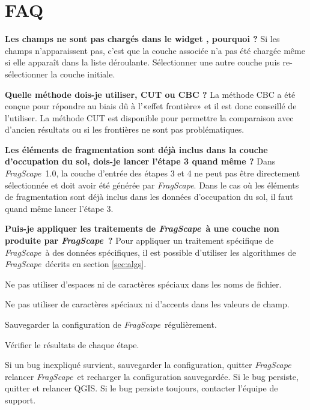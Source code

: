 \documentclass[11pt]{article}
\newcommand{\tool}{\emph{FragScape}}
\let\tempone\itemize
\let\temptwo\enditemize
\renewenvironment{itemize}{\tempone\addtolength{\itemsep}{-0.5\baselineskip}}{\temptwo}
\begin{document}
\section{FAQ}

\begin{itemize}
\item \textbf{Les champs ne sont pas chargés dans le widget , pourquoi ?} Si les champs n'apparaissent pas, c'est que la couche associée n'a pas été chargée même si elle apparaît dans la liste déroulante. Sélectionner une autre couche puis re-sélectionner la couche initiale.

\item \textbf{Quelle méthode dois-je utiliser, CUT ou CBC ?} La méthode CBC a été conçue pour répondre au biais dû à l'«effet frontière» et il est donc conseillé de l'utiliser. La méthode CUT est disponible pour permettre la comparaison avec d'ancien résultats ou si les frontières ne sont pas problématiques.

\item \textbf{Les éléments de fragmentation sont déjà inclus dans la couche d'occupation du sol, dois-je lancer l'étape 3 quand même ?} Dans \tool\ 1.0, la couche d'entrée des étapes 3 et 4 ne peut pas être directement sélectionnée et doit avoir été générée par \tool. Dans le cas où les éléments de fragmentation sont déjà inclus dans les données d'occupation du sol, il faut quand même lancer l'étape 3.

\item \textbf{Puis-je appliquer les traitements de \tool\ à une couche non produite par \tool\ ?} Pour appliquer un traitement spécifique de \tool\ à des données spécifiques, il est possible d'utiliser les algorithmes de \tool\ décrits en section \ref{sec:algs}.

\end{itemize}

\begin{itemize}
    \item Ne pas utiliser d'espaces ni de caractères spéciaux dans les noms de fichier.
    \item Ne pas utiliser de caractères spéciaux ni d'accents dans les valeurs de champ.
    \item Sauvegarder la configuration de \tool\ régulièrement.
    \item Vérifier le résultats de chaque étape.
    \item Si un bug inexpliqué survient, sauvegarder la configuration, quitter \tool\, relancer \tool\ et recharger la configuration sauvegardée. Si le bug persiste, quitter et relancer QGIS. Si le bug persiste toujours, contacter l'équipe de support.
\end{itemize}
\frameboxend
\end{document}
